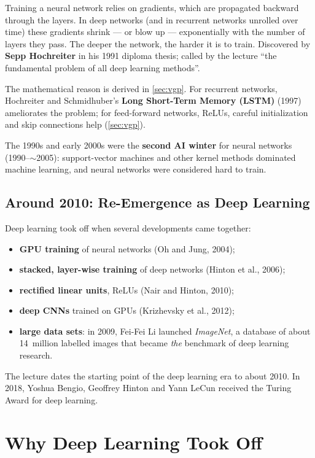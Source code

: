 \documentclass[11pt, oneside]{book}
\let\originalsection\section
\renewcommand{\section}{\Needspace{7\baselineskip}\originalsection}
\let\originalsubsection\subsection
\renewcommand{\subsection}{\Needspace{6\baselineskip}\originalsubsection}
\begin{document}
\begin{defbox}[title={The vanishing gradient problem (VGP)}]
Training a neural network relies on gradients, which are propagated backward
through the layers. In deep networks (and in recurrent networks unrolled
over time) these gradients shrink --- or blow up --- exponentially with the
number of layers they pass. The deeper the network, the harder it is to
train. Discovered by \textbf{Sepp Hochreiter} in his 1991 diploma thesis;
called by the lecture ``the fundamental problem of all deep learning
methods''.
\end{defbox}

The mathematical reason is derived in \cref{sec:vgp}. For recurrent networks,
Hochreiter and Schmidhuber's \textbf{Long Short-Term Memory (LSTM)} (1997)
ameliorates the problem; for feed-forward networks, ReLUs, careful
initialization and skip connections help (\cref{sec:vgp}).

The 1990s and early 2000s were the \textbf{second AI winter} for neural
networks (1990--$\sim$2005): support-vector machines and other kernel
methods dominated machine learning, and neural networks were considered hard
to train.

\subsection{Around 2010: Re-Emergence as Deep Learning}

Deep learning took off when several developments came together:
\begin{itemize}
  \item \textbf{GPU training} of neural networks (Oh and Jung, 2004);
  \item \textbf{stacked, layer-wise training} of deep networks (Hinton et
    al., 2006);
  \item \textbf{rectified linear units}, ReLUs (Nair and Hinton, 2010);
  \item \textbf{deep CNNs} trained on GPUs (Krizhevsky et al., 2012);
  \item \textbf{large data sets}: in 2009, Fei-Fei Li launched
    \emph{ImageNet}, a database of about 14~million labelled images that
    became \emph{the} benchmark of deep learning research.
\end{itemize}
The lecture dates the starting point of the deep learning era to about
2010. In 2018, Yoshua Bengio, Geoffrey Hinton and Yann LeCun received the
Turing Award for deep learning.

\section{Why Deep Learning Took Off}
\end{document}
